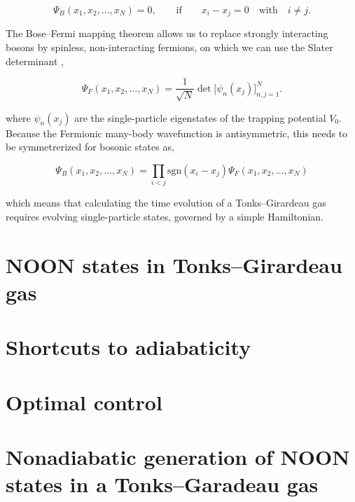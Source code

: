 \begin{equation}
\Psi_B(x_1, x_2, \ldots, x_N) = 0,\qquad \mathrm{if}\qquad x_i - x_j = 0 \quad\textrm{with}\quad i \ne j.
\end{equation}

The Bose--Fermi mapping theorem allows us to replace strongly interacting bosons by spinless, non-interacting fermions, on which we can use the Slater determinant ,

\begin{equation}
\Psi_F (x_1, x_2, \ldots, x_N) = \frac{1}{\sqrt{N}} \det\Big[\psi_n(x_j)\Big]_{n,j=1}^N.
\end{equation}

\noindent where $\psi_n(x_j)$ are the single-particle eigenstates of the trapping potential $V_0$.
Because the Fermionic many-body wavefunction is antisymmetric, this needs to be symmetrerized for bosonic states as, 

\begin{equation}
\Psi_B(x_1, x_2, \ldots, x_N) =
\prod_{i < j}
\mathrm{sgn}(x_i - x_j)\Psi_F(x_1, x_2, \ldots, x_N)
\end{equation}

\noindent which means that calculating the time evolution of a Tonks--Girardeau gas requires evolving single-particle states, governed by a simple Hamiltonian.


\section{NOON states in Tonks--Girardeau gas}

\section{Shortcuts to adiabaticity}
\section{Optimal control}


\section{Nonadiabatic generation of NOON states in a Tonks--Garadeau gas}
